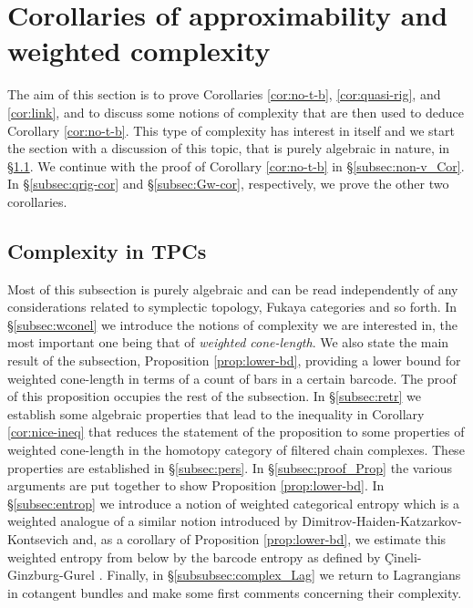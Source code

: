 
\section{Corollaries of approximability and weighted
  complexity}\label{sec:complex}
The aim of this section is to prove Corollaries \ref{cor:no-t-b},
\ref{cor:quasi-rig}, and \ref{cor:link}, and to discuss some notions
of complexity that are then used to deduce Corollary
\ref{cor:no-t-b}. This type of complexity has interest in itself and
we start the section with a discussion of this topic, that is purely
algebraic in nature, in \S\ref{subsec:complex_alg}.  We continue with
the proof of Corollary \ref{cor:no-t-b} in \S\ref{subsec:non-v_Cor}.
In \S\ref{subsec:qrig-cor} and \S\ref{subsec:Gw-cor}, respectively, we
prove the other two corollaries.



\subsection{Complexity in TPCs}\label{subsec:complex_alg}

Most of this subsection is purely algebraic and can be read
independently of any considerations related to symplectic topology,
Fukaya categories and so forth.  In \S\ref{subsec:wconel} we introduce
the notions of complexity we are interested in, the most important one
being that of {\em weighted cone-length}. We also state the main
result of the subsection, Proposition \ref{prop:lower-bd}, providing a
lower bound for weighted cone-length in terms of a count of bars in a
certain barcode.  The proof of this proposition occupies the rest of
the subsection. In \S\ref{subsec:retr} we establish some algebraic
properties that lead to the inequality in Corollary
\ref{cor:nice-ineq} that reduces the statement of the proposition to
some properties of weighted cone-length in the homotopy category of
filtered chain complexes. These properties are established in
\S\ref{subsec:pers}.  In \S\ref{subsec:proof_Prop} the various
arguments are put together to show Proposition \ref{prop:lower-bd}. In
\S\ref{subsec:entrop} we introduce a notion of weighted categorical
entropy which is a weighted analogue of a similar notion introduced by
Dimitrov-Haiden-Katzarkov-Kontsevich \cite{DHKK:dyn_cat} and, as a
corollary of Proposition \ref{prop:lower-bd}, we estimate this
weighted entropy from below by the barcode entropy as defined by
\c{C}ineli-Ginzburg-Gurel \cite{CGG_bar_ent}. Finally, in
\S\ref{subsubsec:complex_Lag} we return to Lagrangians in cotangent
bundles and make some first comments concerning their complexity.

